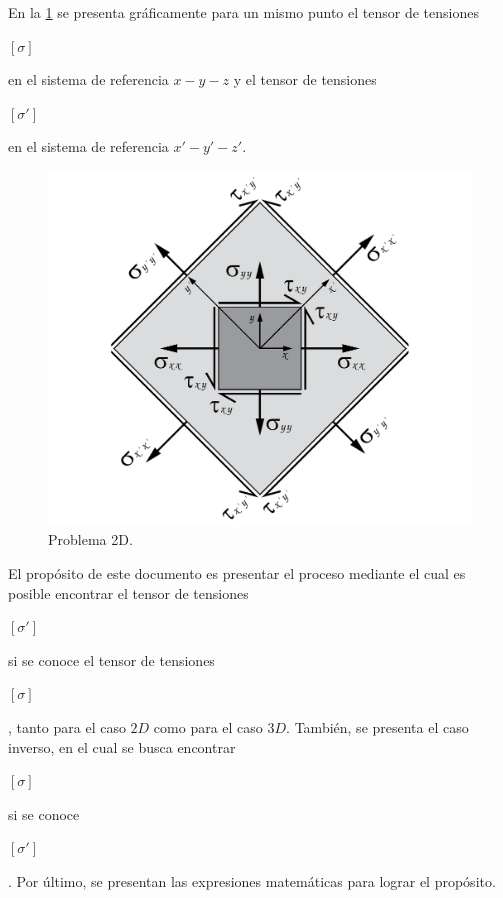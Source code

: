\documentclass[12pt,letterpaper, twoside, openany]{article}
\begin{document}
En la \cref{fig:planteamiento} se presenta gráficamente para un mismo punto el tensor de tensiones \begin{large}$\left[ \sigma \right]$\end{large} en el sistema de referencia $x-y-z$ y el tensor de tensiones \begin{large}$\left[ \sigma' \right]$\end{large} en el sistema de referencia $x'-y'-z'$.
%
\begin{figure}[H]
	\centering
		\includegraphics[width=8 cm]{img/Planteamiento.pdf}
		\caption{Problema 2D.}
		\label{fig:planteamiento}
\end{figure}
%
El propósito de este documento es presentar el proceso mediante el cual es posible encontrar el tensor de tensiones \begin{large}$\left[ \sigma' \right]$\end{large} si se conoce el tensor de tensiones \begin{large}$\left[ \sigma \right]$\end{large}, tanto para el caso $2D$ como para el caso $3D$. También, se presenta el caso inverso, en el cual se busca encontrar \begin{large}$\left[ \sigma \right]$\end{large} si se conoce \begin{large}$\left[ \sigma' \right]$\end{large}. Por último, se presentan las expresiones matemáticas para lograr el propósito.
%
\end{document}
